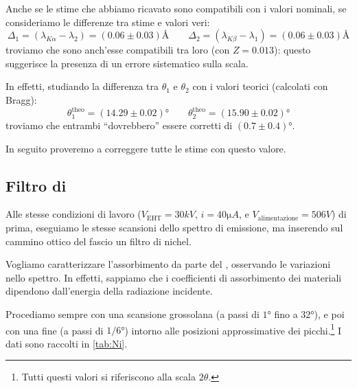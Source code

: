 Anche se le stime che abbiamo ricavato sono compatibili con i valori nominali, se consideriamo le differenze tra stime e valori veri:
\begin{equation}
\Delta_1 = (\lambda_{K\alpha} - \lambda_2) = (0.06 \pm 0.03) \unit{\angstrom} \qquad \Delta_2 = (\lambda_{K\beta} - \lambda_1) = (0.06 \pm 0.03) \unit{\angstrom}
\end{equation}
troviamo che sono anch'esse compatibili tra loro (con $ Z = 0.013 $): questo suggerisce la presenza di un errore sistematico sulla scala.

In effetti, studiando la differenza tra $ \theta_1 $ e $\theta_2$ con i valori teorici (calcolati con Bragg):
\begin{equation}
\theta_1^\text{theo} = (14.29 \pm 0.02) \unit{\degree} \qquad \theta_2^\text{theo} = (15.90 \pm 0.02) \unit{\degree} 
\end{equation} 
troviamo che entrambi ``dovrebbero'' essere corretti di $ (0.7 \pm 0.4) \unit{\degree} $.

In seguito proveremo a correggere tutte le stime con questo valore.

\subsection{Filtro di }

Alle stesse condizioni di lavoro ($V_\text{EHT} = 30 \unit{kV}$, $ i = 40 \unit{\micro A} $, e $ V_\text{alimentazione} = 506 \unit{V} $) di prima, eseguiamo le stesse scansioni dello spettro di emissione, ma inserendo sul cammino ottico del fascio un filtro di nichel.

Vogliamo caratterizzare l'assorbimento da parte del , osservando le variazioni nello spettro.
In effetti, sappiamo che i coefficienti di assorbimento dei materiali dipendono dall'energia della radiazione incidente.

Procediamo sempre con una scansione grossolana (a passi di $ 1 \unit{\degree} $ fino a $ 32 \unit{\degree} $), e poi con una fine (a passi di $ 1/6 \unit{\degree} $) intorno alle posizioni approssimative dei picchi.\footnote{Tutti questi valori si riferiscono alla scala $ 2\theta $.}
I dati sono raccolti in \cref{tab:Ni}.

